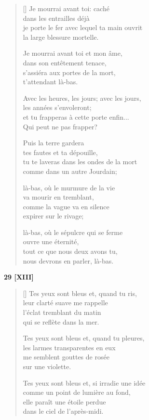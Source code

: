 \documentclass[a4paper,12pt]{book}
\begin{document}
\begin{verse}[\versewidth]
  Je mourrai avant toi: caché \\
  dans les entrailles déjà \\
  je porte le fer avec lequel ta main ouvrit \\
  la large blessure mortelle.

  Je mourrai avant toi et mon âme, \\
  dans son entêtement tenace, \\
  s'assiéra aux portes de la mort, \\
  t'attendant là-bas.

  Avec les heures, les jours; avec les jours, \\
  les années s'envoleront; \\
  et tu frapperas à cette porte enfin... \\
  Qui peut ne pas frapper?

  Puis la terre gardera \\
  tes fautes et ta dépouille, \\
  tu te laveras dans les ondes de la mort \\
  comme dans un autre Jourdain;

  là-bas, où le murmure de la vie \\
  va mourir en tremblant, \\
  comme la vague va en silence \\
  expirer sur le rivage;

  là-bas, où le sépulcre qui se ferme \\
  ouvre une éternité, \\
  tout ce que nous deux avons tu, \\
  nous devrons en parler, là-bas.
\end{verse}

\bigskip

\begin{center}
  \textbf{29 [XIII]}
\end{center}

\settowidth{\versewidth}{comme un point de lumière irradie une idée,}

\begin{verse}[\versewidth]
  Tes yeux sont bleus et, quand tu ris, \\
  leur clarté suave me rappelle \\
  l'éclat tremblant du matin \\
  qui se reflète dans la mer.

  Tes yeux sont bleus et, quand tu pleures, \\
  les larmes transparentes en eux \\
  me semblent gouttes de rosée \\
  sur une violette.

  Tes yeux sont bleus et, si irradie une idée \\
  comme un point de lumière au fond, \\
  elle paraît une étoile perdue \\
  dans le ciel de l'après-midi.
\end{verse}
\end{document}
